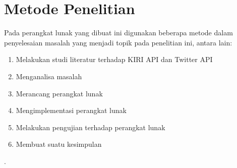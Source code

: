 \section{Metode Penelitian}
Pada perangkat lunak yang dibuat ini digunakan beberapa metode dalam penyelesaian masalah yang menjadi topik pada penelitian ini, antara lain:
\begin{enumerate}
	\item Melakukan studi literatur terhadap KIRI API dan Twitter API
	\item Menganalisa masalah
	\item Merancang perangkat lunak
	\item Mengimplementasi perangkat lunak
	\item Melakukan pengujian terhadap perangkat lunak
	\item Membuat suatu kesimpulan
\end{enumerate}.
